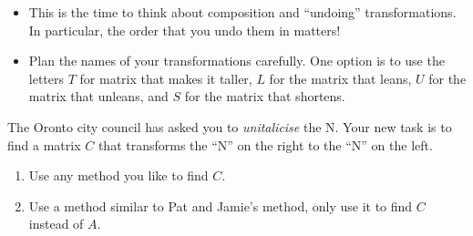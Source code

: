 \begin{iola}
	\begin{annotation}
		\begin{notes}
			\begin{itemize}
				\item This is the time to think about composition and ``undoing''
					transformations. In particular, the order that you undo
					them in matters!
				\item Plan the names of your transformations carefully. One option is to use the letters
					$T$ for matrix that makes it taller, $L$ for the matrix that leans,
					$U$ for the matrix that unleans, and $S$ for the matrix that shortens.
			\end{itemize}
		\end{notes}
	\end{annotation}

	The Oronto city council has asked you to \emph{unitalicise} the N.
	Your new task is to find a matrix $C$ that transforms the ``N'' on the right to the ``N'' on the left.
\begin{enumerate}
	\item Use any method you like to find $C$.
	\item Use a method similar to Pat and Jamie's method, only use it to find $C$ instead
		of $A$.
\end{enumerate}
\end{iola}


